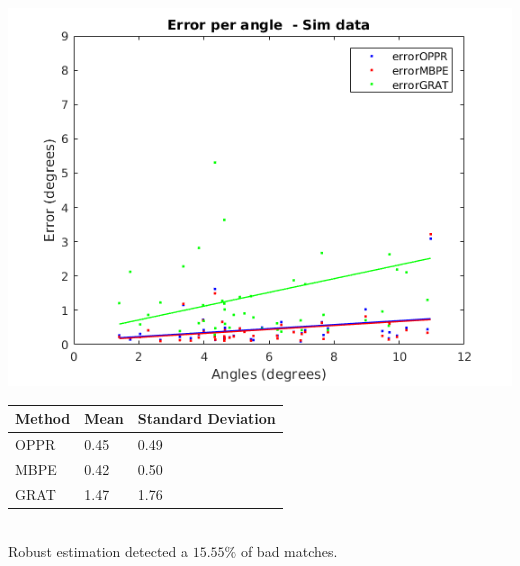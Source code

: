 \begin{minipage}{0.5\textwidth}
	\centering
	\includegraphics[width=\textwidth]{images/sim/10angle.png}
	\label{cha5:sec1:10angle}
\end{minipage}
\begin{minipage}{0.5\textwidth}
	\centering
	\begin{tabular}{| l | l | l |}
			\hline
			Method & Mean & Standard Deviation \\
			\hline
			OPPR &  0.45 \degree & 0.49 \degree \\
			\hline
			MBPE &  0.42 \degree & 0.50 \degree \\
			\hline
			GRAT &  1.47 \degree & 1.76 \degree \\ 
			\hline
	\end{tabular}
	\label{cha5:sec1:10anglet}
\end{minipage}\\

Robust estimation detected a $ 15.55 \%$ of bad matches.

